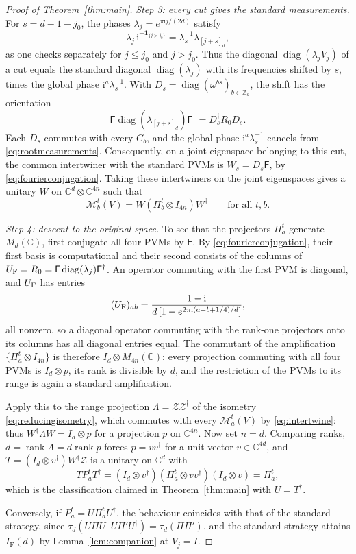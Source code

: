 \documentclass[aps,prl,reprint,superscriptaddress,longbibliography,floatfix,raggedbottom]{revtex4-2}
\newcommand{\C}{\mathbb C}
\newcommand{\Z}{\mathbb Z}
\newcommand{\ii}{\mathrm i}
\newcommand{\ind}{\mathbf 1}
\DeclareMathOperator{\rank}{rank}
\DeclareMathOperator{\diag}{diag}
\newcommand{\tr}{\tau}
\newcommand{\IF}{I_{\mathrm F}}
\newcommand{\Zisom}{\mathcal Z}
\newcommand{\RootP}{\mathcal M}
\begin{document}
\begin{proof}[Proof of Theorem~\ref{thm:main}]
\emph{Step 3: every cut gives the standard measurements.}
For $s=d-1-j_0$, the phases $\lambda_j=e^{\pi\ii j/(2d)}$ satisfy
\[
\lambda_j\,\ii^{-\ind_{\{j>j_0\}}}
=\lambda_s^{-1}\lambda_{[j+s]_d},
\]
as one checks separately for $j\le j_0$ and $j>j_0$. Thus the diagonal
$\diag(\lambda_jV_j)$ of a cut equals the standard diagonal
$\diag(\lambda_j)$ with its frequencies shifted by $s$, times the
global phase $\ii^a\lambda_s^{-1}$.
With $D_s=\diag(\omega^{bs})_{b\in\Z_d}$, the shift has the orientation
\begin{equation}\label{eq:cutconjugation}
\mathsf F\diag(\lambda_{[j+s]_d})\mathsf F^\dagger
=D_s^\dagger R_0D_s.
\end{equation}
Each $D_s$ commutes with every $C_b$, and the global phase
$\ii^a\lambda_s^{-1}$ cancels from \eqref{eq:rootmeasurements}.
Consequently, on a joint eigenspace belonging to this cut, the common
intertwiner with the standard PVMs is
$W_s=D_s^\dagger\mathsf F$, by \eqref{eq:fourierconjugation}.
Taking these intertwiners on the joint eigenspaces gives a unitary $W$
on $\C^d\otimes\C^{4n}$ such that
\[
\RootP^t_b(V)=W(\Pi^t_b\otimes I_{4n})W^\dagger
\qquad\text{for all }t,b.
\]

\emph{Step 4: descent to the original space.}
To see that the projectors $\Pi^t_a$ generate $M_d(\C)$, first
conjugate all four PVMs by $\mathsf F$. By
\eqref{eq:fourierconjugation}, their first basis is computational and
their second consists of the columns of
$U_{\rm F}=R_0=\mathsf F\diag(\lambda_j)\mathsf F^\dagger$. An operator
commuting with the first PVM is diagonal, and $U_{\rm F}$ has entries
\[
(U_{\rm F})_{ab}
=\frac{1-\ii}{d\,[1-e^{2\pi\ii(a-b+1/4)/d}]},
\]
all nonzero, so a diagonal operator commuting with the rank-one
projectors onto its columns has all diagonal entries equal. The
commutant of the amplification $\{\Pi^t_a\otimes I_{4n}\}$ is therefore
$I_d\otimes M_{4n}(\C)$: every projection commuting with all four PVMs
is $I_d\otimes p$, its rank is divisible by $d$, and the restriction of
the PVMs to its range is again a standard amplification.

Apply this to the range projection $\Lambda=\Zisom\Zisom^\dagger$ of
the isometry \eqref{eq:reducingisometry}, which commutes with
every $\RootP^t_a(V)$ by \eqref{eq:intertwine}: thus $W^\dagger\Lambda W=I_d\otimes p$ for a
projection $p$ on $\C^{4n}$. Now set $n=d$. Comparing ranks,
$d=\rank\Lambda=d\rank p$ forces $p=vv^\dagger$ for a unit vector
$v\in\C^{4d}$, and $T=(I_d\otimes v^\dagger)W^\dagger\Zisom$ is a
unitary on $\C^d$ with
\[
TP^t_aT^\dagger
=(I_d\otimes v^\dagger)(\Pi^t_a\otimes vv^\dagger)(I_d\otimes v)
=\Pi^t_a ,
\]
which is the classification claimed in Theorem~\ref{thm:main} with
$U=T^\dagger$.

Conversely, if $P^t_a=U\Pi^t_aU^\dagger$, the behaviour coincides with
that of the standard strategy, since
$\tr_d(U\Pi U^\dagger\,U\Pi'U^\dagger)=\tr_d(\Pi\Pi')$, and the
standard strategy attains $\IF(d)$ by Lemma~\ref{lem:companion} at
$V_j=I$.
\end{proof}
\end{document}
